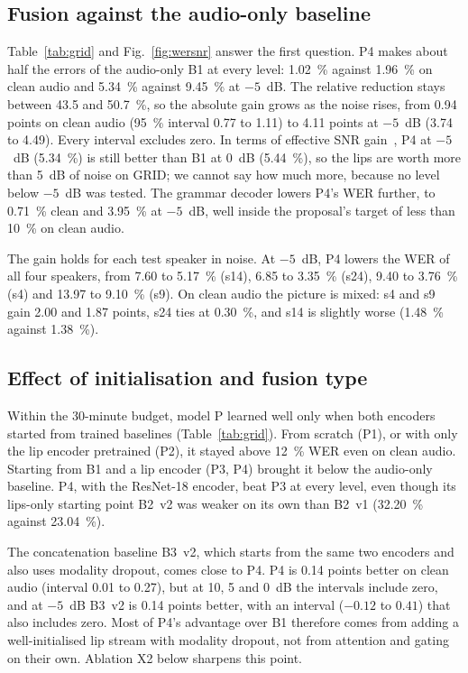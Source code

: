 \subsection{Fusion against the audio-only baseline}
Table~\ref{tab:grid} and Fig.~\ref{fig:wersnr} answer the first question. P4 makes about half the
errors of the audio-only B1 at every level: 1.02~\% against 1.96~\% on clean audio and 5.34~\%
against 9.45~\% at $-5$~dB. The relative reduction stays between 43.5 and 50.7~\%, so the absolute
gain grows as the noise rises, from 0.94 points on clean audio (95~\% interval 0.77 to 1.11) to
4.11 points at $-5$~dB (3.74 to 4.49). Every interval excludes zero. In terms of effective SNR
gain~\cite{lin2025}, P4 at $-5$~dB (5.34~\%) is still better than B1 at 0~dB (5.44~\%), so the
lips are worth more than 5~dB of noise on GRID; we cannot say how much more, because no level below
$-5$~dB was tested. The grammar decoder lowers P4's WER further, to 0.71~\% clean and 3.95~\% at
$-5$~dB, well inside the proposal's target of less than 10~\% on clean audio.

The gain holds for each test speaker in noise. At $-5$~dB, P4 lowers the WER of all four speakers,
from 7.60 to 5.17~\% (s14), 6.85 to 3.35~\% (s24), 9.40 to 3.76~\% (s4) and 13.97 to 9.10~\%
(s9). On clean audio the picture is mixed: s4 and s9 gain 2.00 and 1.87 points, s24 ties at
0.30~\%, and s14 is slightly worse (1.48~\% against 1.38~\%).

\subsection{Effect of initialisation and fusion type}
Within the 30-minute budget, model P learned well only when both encoders started from trained
baselines (Table~\ref{tab:grid}). From scratch (P1), or with only the lip encoder pretrained (P2),
it stayed above 12~\% WER even on clean audio. Starting from B1 and a lip encoder (P3, P4) brought it
below the audio-only baseline. P4, with the ResNet-18 encoder, beat P3 at every level, even though
its lips-only starting point B2~v2 was weaker on its own than B2~v1 (32.20~\% against 23.04~\%).

The concatenation baseline B3~v2, which starts from the same two encoders and also uses modality
dropout, comes close to P4. P4 is 0.14 points better on clean audio (interval 0.01 to 0.27), but
at 10, 5 and 0~dB the intervals include zero, and at $-5$~dB B3~v2 is 0.14 points better, with an
interval ($-0.12$ to $0.41$) that also includes zero. Most of P4's advantage over B1 therefore comes
from adding a well-initialised lip stream with modality dropout, not from attention and gating on
their own. Ablation X2 below sharpens this point.

